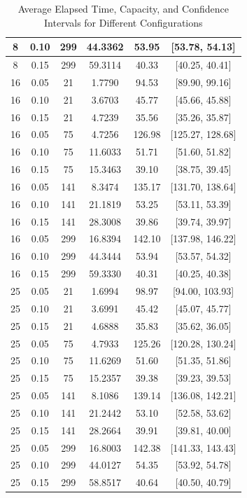 \documentclass[10pt,a4paper]{article}
\begin{document}
\begin{table}[H]
\begin{tabular}{|c|c|c|c|c|c|}
    8 & 0.10 & 299 & 44.3362 & 53.95 & [53.78, 54.13] \\ \hline
    8 & 0.15 & 299 & 59.3114 & 40.33 & [40.25, 40.41] \\ \hline
    16 & 0.05 & 21 & 1.7790 & 94.53 & [89.90, 99.16] \\ \hline
    16 & 0.10 & 21 & 3.6703 & 45.77 & [45.66, 45.88] \\ \hline
    16 & 0.15 & 21 & 4.7239 & 35.56 & [35.26, 35.87] \\ \hline
    16 & 0.05 & 75 & 4.7256 & 126.98 & [125.27, 128.68] \\ \hline
    16 & 0.10 & 75 & 11.6033 & 51.71 & [51.60, 51.82] \\ \hline
    16 & 0.15 & 75 & 15.3463 & 39.10 & [38.75, 39.45] \\ \hline
    16 & 0.05 & 141 & 8.3474 & 135.17 & [131.70, 138.64] \\ \hline
    16 & 0.10 & 141 & 21.1819 & 53.25 & [53.11, 53.39] \\ \hline
    16 & 0.15 & 141 & 28.3008 & 39.86 & [39.74, 39.97] \\ \hline
    16 & 0.05 & 299 & 16.8394 & 142.10 & [137.98, 146.22] \\ \hline
    16 & 0.10 & 299 & 44.3444 & 53.94 & [53.57, 54.32] \\ \hline
    16 & 0.15 & 299 & 59.3330 & 40.31 & [40.25, 40.38] \\ \hline
    25 & 0.05 & 21 & 1.6994 & 98.97 & [94.00, 103.93] \\ \hline
    25 & 0.10 & 21 & 3.6991 & 45.42 & [45.07, 45.77] \\ \hline
    25 & 0.15 & 21 & 4.6888 & 35.83 & [35.62, 36.05] \\ \hline
    25 & 0.05 & 75 & 4.7933 & 125.26 & [120.28, 130.24] \\ \hline
    25 & 0.10 & 75 & 11.6269 & 51.60 & [51.35, 51.86] \\ \hline
    25 & 0.15 & 75 & 15.2357 & 39.38 & [39.23, 39.53] \\ \hline
    25 & 0.05 & 141 & 8.1086 & 139.14 & [136.08, 142.21] \\ \hline
    25 & 0.10 & 141 & 21.2442 & 53.10 & [52.58, 53.62] \\ \hline
    25 & 0.15 & 141 & 28.2664 & 39.91 & [39.81, 40.00] \\ \hline
    25 & 0.05 & 299 & 16.8003 & 142.38 & [141.33, 143.43] \\ \hline
    25 & 0.10 & 299 & 44.0127 & 54.35 & [53.92, 54.78] \\ \hline
    25 & 0.15 & 299 & 58.8517 & 40.64 & [40.50, 40.79] \\ \hline
    \end{tabular}
    \caption{Average Elapsed Time, Capacity, and Confidence Intervals for Different Configurations}
    \label{tab:results}
\end{table}
\end{document}

